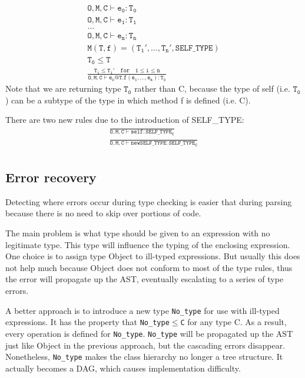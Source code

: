 \begin{gather*}
\mathtt{O,M,C\vdash e_0:T_0}\\
\mathtt{O,M,C\vdash e_1:T_1}\\
\dots\\
\mathtt{O,M,C\vdash e_n:T_n}\\
\mathtt{M(T,f) = (T_1',\dots,T_n',SELF\_TYPE)}\\
\mathtt{T_0\leq T}\\
\mathtt{\frac{T_i\leq T_i'\quad for\quad1\leq i \leq n}{O,M,C\vdash e_0@T.f(e_1,\dots,e_n): T_0}}
\end{gather*}
Note that we are returning type $\mathtt{T_0}$ rather than C, because the type of self (i.e. $\mathtt{T_0}$) can be a subtype of the type in which method f is defined (i.e. C).

There are two new rules due to the introduction of SELF\_TYPE:
\begin{gather*}
\mathtt{\frac{}{O,M,C\vdash self : SELF\_TYPE_C}}\\
\mathtt{\frac{}{O,M,C\vdash new SELF\_TYPE : SELF\_TYPE_C}}\\
\end{gather*}
\subsection{Error recovery}
Detecting where errors occur during type checking is easier that during parsing because there is no need to skip over portions of code. 

The main problem is what type should be given to an expression with no legitimate type. This type will influence the typing of the enclosing expression. One choice is to assign type Object to ill-typed expressions. But usually this does not help much because Object does not conform to most of the type rules, thus the error will propagate up the AST, eventually escalating to a series of type errors.

A better approach is to introduce a new type \texttt{No\_type} for use with ill-typed expressions. It has the property that \texttt{No\_type$\leq$C} for any type C. As a result, every operation is defined for \texttt{No\_type}. \texttt{No\_type} will be propagated up the AST just like Object in the previous approach, but the cascading errors disappear. Nonetheless, \texttt{No\_type} makes the class hierarchy no longer a tree structure. It actually becomes a DAG, which causes implementation difficulty.
\ifx\PREAMBLE\undefined

\fi